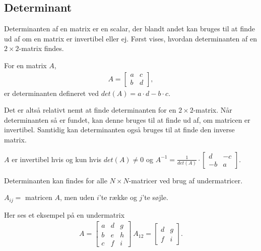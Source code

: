 \subsection{Determinant}
Determinanten af en matrix er en scalar, der blandt andet kan bruges til at finde ud af om en matrix er invertibel eller ej.
Først vises, hvordan determinanten af en $2 \times 2$-matrix findes.

\begin{defn}
For en matrix $A$, 
\begin{align*}
A= \begin{bmatrix}
a & c \\
b & d
\end{bmatrix},
\end{align*}
er determinanten defineret ved $det(A)=a \cdot d - b \cdot c$.
\end{defn}

Det er altså relativt nemt at finde determinanten for en $2 \times 2$-matrix. 
Når determinanten så er fundet, kan denne bruges til at finde ud af, om matricen er invertibel. 
Samtidig kan determinanten også bruges til at finde den inverse matrix. 

\begin{stn}
$A$ er invertibel hvis og kun hvis $det(A) \neq 0$ og $A^{-1} = \frac{1}{det(A)} \cdot \begin{bmatrix}
d & -c \\
-b & a
\end{bmatrix}$.
\end{stn}

Determinanten kan findes for alle $N \times N$-matricer ved brug af undermatricer.

\begin{defn}
$A_{ij} =$ matricen $A$, men uden $i$'te række og $j$'te søjle. 
\end{defn}

\begin{eks}
Her ses et eksempel på en undermatrix
\begin{align}
A=\begin{bmatrix}
a & d & g \\
b & e & h \\
c & f & i
\end{bmatrix}
\: A_{12}=\begin{bmatrix}
d & g \\
f & i
\end{bmatrix}.
\end{align}
\end{eks}

